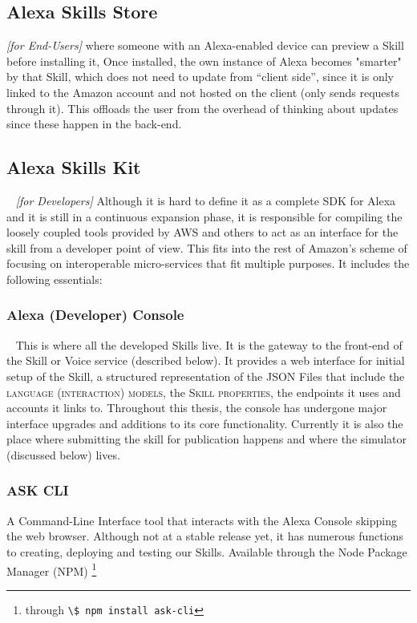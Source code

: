 	
	\subsection*{Alexa Skills Store} \textit{[for End-Users]} where someone with an Alexa-enabled device can preview a Skill before installing it, %
	Once installed, the own instance of Alexa becomes "smarter" by that Skill, which does not need to update from ``client side'', since it is only linked to the Amazon account and not hosted on the client (only sends requests through it).  %
	This offloads the user from the overhead of %
	thinking about updates since these happen in the back-end. 
	
	
	\subsection*{Alexa Skills Kit}~\label{ask:def} \textit{[for Developers]} Although it is hard to define it as a complete SDK for Alexa and it is still in a continuous expansion phase, it is responsible for compiling the loosely coupled tools provided by AWS and others to act as an interface for the skill from a developer point of view. This fits into the rest of Amazon's scheme of focusing on interoperable micro-services that fit multiple purposes. It includes the following essentials:
	
	
		\subsubsection*{Alexa (Developer) Console}~\label{ask:devconsole} This is where all the developed Skills live. It is the gateway to the front-end of the Skill or Voice service (described below). It provides a web interface for initial setup of the Skill, a structured representation of the JSON Files that include the \textsc{language (interaction) models}, the \textsc{Skill properties}, the endpoints it uses and accounts it links to. 
		Throughout this thesis, the console has undergone major interface upgrades and additions to its core functionality. Currently it is also the place where submitting the skill for publication happens and where the simulator (discussed below) lives.
		
		\subsubsection*{ASK CLI} %
		A Command-Line Interface tool that interacts with the Alexa Console skipping the web browser. %
		Although not at a stable release yet, it has numerous functions to creating, deploying and testing our Skills. %
		Available through the Node Package Manager (NPM) \footnote{
			through \lstinline|\$ npm install ask-cli| }
		
